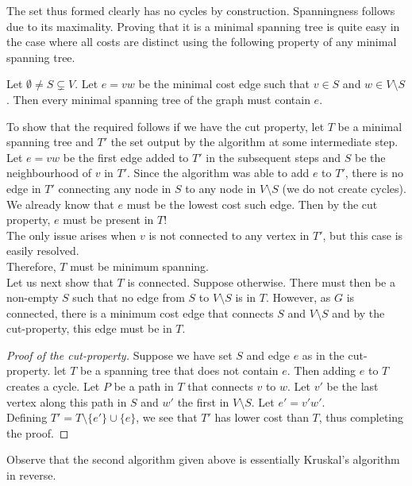 The set thus formed clearly has no cycles by construction. Spanningness follows due to its maximality. Proving that it is a minimal spanning tree is quite easy in the case where all costs are distinct using the following property of any minimal spanning tree.

\begin{lemma}
	Let $\emptyset\neq S\subsetneq V$. Let $e=vw$ be the minimal cost edge such that $v\in S$ and $w\in V\setminus S$. Then every minimal spanning tree of the graph must contain $e$.
\end{lemma}

To show that the required follows if we have the cut property, let $T$ be a minimal spanning tree and $T'$ the set output by the algorithm at some intermediate step.\\
Let $e=vw$ be the first edge added to $T'$ in the subsequent steps and $S$ be the neighbourhood of $v$ in $T'$. Since the algorithm was able to add $e$ to $T'$, there is no edge in $T'$ connecting any node in $S$ to any node in $V\setminus S$ (we do not create cycles). We already know that $e$ must be the lowest cost such edge. Then by the cut property, $e$ must be present in $T$!\\
The only issue arises when $v$ is not connected to any vertex in $T'$, but this case is easily resolved.\\
Therefore, $T$ must be minimum spanning.\\

Let us next show that $T$ is connected. Suppose otherwise. There must then be a non-empty $S$ such that no edge from $S$ to $V\setminus S$ is in $T$. However, as $G$ is connected, there is a minimum cost edge that connects $S$ and $V\setminus S$ and by the cut-property, this edge must be in $T$.

\begin{proof}[Proof of the cut-property]
	Suppose we have set $S$ and edge $e$ as in the cut-property. let $T$ be a spanning tree that does not contain $e$. Then adding $e$ to $T$ creates a cycle. Let $P$ be a path in $T$ that connects $v$ to $w$. Let $v'$ be the last vertex along this path in $S$ and $w'$ the first in $V\setminus S$. Let $e'=v'w'$.\\
	Defining $T' = T\setminus\{e'\}\cup\{e\}$, we see that $T'$ has lower cost than $T$, thus completing the proof. 
\end{proof}

Observe that the second algorithm given above is essentially Kruskal's algorithm in reverse.\\

